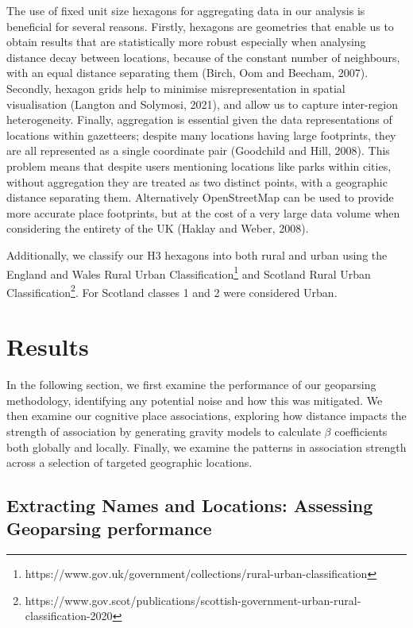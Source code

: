 \documentclass[
  letterpaper,
  11pt,
  english,
  onehalfspacing,
  headsepline]{MastersDoctoralThesis}
\begin{document}
The use of fixed unit size hexagons for aggregating data in our analysis
is beneficial for several reasons. Firstly, hexagons are geometries that
enable us to obtain results that are statistically more robust
especially when analysing distance decay between locations, because of
the constant number of neighbours, with an equal distance separating
them (Birch, Oom and Beecham, 2007). Secondly, hexagon grids help to
minimise misrepresentation in spatial visualisation (Langton and
Solymosi, 2021), and allow us to capture inter-region heterogeneity.
Finally, aggregation is essential given the data representations of
locations within gazetteers; despite many locations having large
footprints, they are all represented as a single coordinate pair
(Goodchild and Hill, 2008). This problem means that despite users
mentioning locations like parks within cities, without aggregation they
are treated as two distinct points, with a geographic distance
separating them. Alternatively OpenStreetMap can be used to provide more
accurate place footprints, but at the cost of a very large data volume
when considering the entirety of the UK (Haklay and Weber, 2008).

Additionally, we classify our H3 hexagons into both rural and urban
using the England and Wales Rural Urban Classification\footnote{https://www.gov.uk/government/collections/rural-urban-classification}
and Scotland Rural Urban Classification\footnote{https://www.gov.scot/publications/scottish-government-urban-rural-classification-2020}.
For Scotland classes 1 and 2 were considered Urban.

\hypertarget{sec-resultscon}{%
\section{Results}\label{sec-resultscon}}

In the following section, we first examine the performance of our
geoparsing methodology, identifying any potential noise and how this was
mitigated. We then examine our cognitive place associations, exploring
how distance impacts the strength of association by generating gravity
models to calculate \(\beta\) coefficients both globally and locally.
Finally, we examine the patterns in association strength across a
selection of targeted geographic locations.

\hypertarget{extracting-names-and-locations-assessing-geoparsing-performance}{%
\subsection{Extracting Names and Locations: Assessing Geoparsing
performance}\label{extracting-names-and-locations-assessing-geoparsing-performance}}
\end{document}
